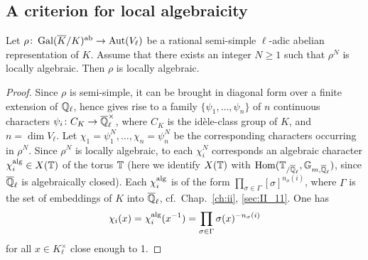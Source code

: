 \subsection{A criterion for local algebraicity}
\label{sec:III_32}
\begin{prop}
	Let $\rho\colon \operatorname{Gal}(\overline{K}/K)^{\mathrm{ab}} \to \operatorname{Aut}(V_\ell)$ be a rational
	semi-simple $\ell$-adic abelian representation of $K$. Assume that
	there exists an integer $N \ge 1$ such that $\rho^N$ is locally
	algebraic. Then $\rho$ is locally algebraic.
\end{prop}
\begin{proof}
	\dpage
	Since $\rho$ is semi-simple, it can be brought in diagonal form over a
	finite extension of $\mathbb{Q}_\ell$, hence gives rise to a family $\{ \psi_1,
	\dots, \psi_n \}$ of $n$ continuous characters $\psi_i\colon C_K \to
	\overline{\mathbb{Q}}_\ell^\times$, where $C_K$ is the idèle-class group of $K$,
	and $n = \dim V_\ell$.
	Let $\chi_1 = \psi_1^N, \dots, \chi_n = \psi_n^N$ be the corresponding
	characters occurring in $\rho^N$. Since $\rho^N$ is locally algebraic,
	to each $\chi_i^N$ corresponds an algebraic character $\chi_i^{\rm alg}
	\in X(\mathbb{T})$ of the torus $\mathbb{T}$ (here we identify $X(\mathbb{T})$ with
	$\operatorname{Hom}(\mathbb{T}_{/\overline{\mathbb{Q}}_\ell}, \mathbb{G}_{m, \overline{\mathbb{Q}}_\ell})$, since
	$\overline{\mathbb{Q}}_\ell$ is algebraically closed). Each $\chi_i^{\rm alg}$ is of
	the form $\prod_{\sigma \in \Gamma} [\sigma]^{n_\sigma(i)}$, where
	$\Gamma$ is the set of embeddings of $K$ into $\overline{\mathbb{Q}}_\ell$, cf.\ 
	Chap.~\ref{ch:ii}, \ref{sec:II_11}. One has
	\[
		\chi_i(x) = \chi_i^{\rm alg}(x^{-1}) = \prod_{\sigma \in
		\Gamma} \sigma(x)^{-n_\sigma(i)}
	\]
	for all $x \in K_\ell^\times$ close enough to 1.
\end{proof}

